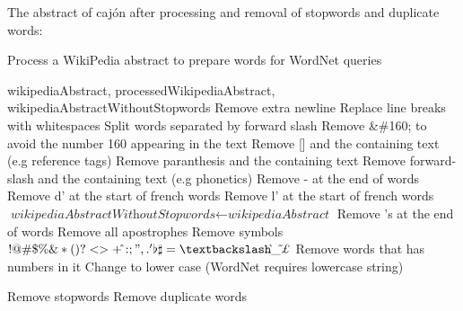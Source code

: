 The abstract of cajón after processing and removal of stopwords and duplicate words:

\noindent{}

\begin{algorithm}
	\caption{Process a WikiPedia abstract to prepare words for WordNet queries}\label{euclid}
	\begin{algorithmic}[1]
		\Require wikipediaAbstract,
		\Ensure processedWikipediaAbstract, wikipediaAbstractWithoutStopwords
		\State Remove extra newline
		\State Replace line breaks with whitespaces
		\State Split words separated by forward slash
		\State Remove \&\#160; to avoid the number 160 appearing in the text
		\State Remove [] and the containing text (e.g reference tags)
		\State Remove paranthesis and the containing text
		\State Remove forward-slash and the containing text (e.g phonetics)
		\State Remove - at the end of words
		\State Remove d' at the start of french words
		\State Remove l' at the start of french words
		\EndFor
		\State $\textit{wikipediaAbstractWithoutStopwords} \gets \textit{wikipediaAbstract}$
		\State Remove 's at the end of words
		\State Remove all apostrophes
		\State Remove symbols $!@\#\$\%\&*(){}?<>+\hat{}:;",.'\flat\sharp=\textbackslash\grave{}\_\tilde{}\pounds$\texteuro\textcurrency
		\State Remove words that has numbers in it
		\State Change to lower case (WordNet requires lowercase string)
		
		\State Remove stopwords
		\State Remove duplicate words
		\EndFor
		
		\State {}
		\EndProcedure
	\end{algorithmic}
\end{algorithm}


